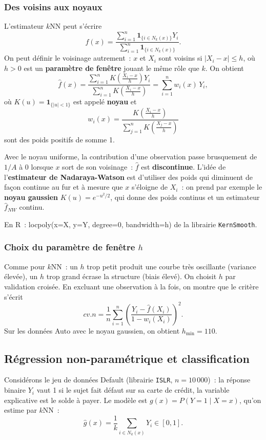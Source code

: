\documentclass[11pt,letterpaper]{article}
\begin{document}
\subsubsection{Des voisins aux noyaux}

L'estimateur $k$NN peut s'écrire
$$\hat f(x) = \frac{\sum_{i=1}^n \mathbf{1}_{\{i\in N_k(x)\}}Y_i}{\sum_{i=1}^n \mathbf{1}_{\{i\in N_k(x)\}}}.$$
On peut définir le voisinage autrement~: $x$ et $X_i$ sont voisins si $|X_i - x| \leq h$, où $h > 0$ est un \textbf{paramètre de fenêtre} jouant le même rôle que $k$. On obtient
$$\hat f(x) = \frac{\sum_{i=1}^n K\!\left(\frac{X_i - x}{h}\right)Y_i}{\sum_{i=1}^n K\!\left(\frac{X_i - x}{h}\right)} = \sum_{i=1}^n w_i(x)\,Y_i,$$
où $K(u) = \mathbf{1}_{\{|u|<1\}}$ est appelé \textbf{noyau} et
$$w_i(x) = \frac{K\!\left(\frac{X_i - x}{h}\right)}{\sum_{j=1}^n K\!\left(\frac{X_j - x}{h}\right)}$$
sont des poids positifs de somme 1.

Avec le noyau uniforme, la contribution d'une observation passe brusquement de $1/A$ à 0 lorsque $x$ sort de son voisinage~: $\hat f$ est \textbf{discontinue}. L'idée de l'\textbf{estimateur de Nadaraya-Watson} est d'utiliser des poids qui diminuent de façon continue au fur et à mesure que $x$ s'éloigne de $X_i$~: on prend par exemple le \textbf{noyau gaussien} $K(u) = e^{-u^2/2}$, qui donne des poids continus et un estimateur $\hat f_{NW}$ continu.

En \textrm{R}~: \textsf{locpoly(x=X, y=Y, degree=0, bandwidth=h)} de la librairie \texttt{KernSmooth}.

\subsubsection{Choix du paramètre de fenêtre $h$}

Comme pour $k$NN~: un $h$ trop petit produit une courbe très oscillante (variance élevée), un $h$ trop grand écrase la structure (biais élevé). On choisit $h$ par validation croisée. En excluant une observation à la fois, on montre que le critère s'écrit
$$cv.n = \frac{1}{n}\sum_{i=1}^n\left(\frac{Y_i - \hat f(X_i)}{1 - w_i(X_i)}\right)^2.$$
Sur les données \textsf{Auto} avec le noyau gaussien, on obtient $h_{\min} = 110$.

\subsection{Régression non-paramétrique et classification}

Considérons le jeu de données \textsf{Default} (librairie \texttt{ISLR}, $n = 10\,000$)~: la réponse binaire $Y_i$ vaut 1 si le sujet fait défaut sur sa carte de crédit, la variable explicative est le solde à payer. Le modèle est $g(x) = P(Y = 1\mid X = x)$, qu'on estime par $k$NN~:
$$\hat g(x) = \frac{1}{k}\sum_{i\in N_k(x)}Y_i \in [0,1].$$
\end{document}
